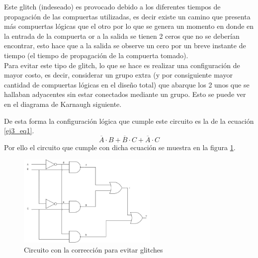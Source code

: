 %
\noindent
Este glitch (indeseado) es provocado debido a los diferentes tiempos de propagaci\'on de las compuertas utilizadas, es decir existe un camino que presenta m\'as compuertas l\'ogicas que el otro por lo que se genera un momento en donde en la entrada de la compuerta or a la salida se tienen 2 ceros que no se deber\'ian encontrar, esto hace que a la salida se observe un cero por un breve instante de tiempo (el tiempo de propagación de la compuerta tomado).\\
Para evitar este tipo de glitch, lo que se hace es realizar una configuración de mayor costo, es decir, considerar un grupo extra (y por consiguiente mayor cantidad de compuertas l\'ogicas en el diseño total) que abarque los 2 unos que se hallaban adyacentes sin estar conectados mediante un grupo. Esto se puede ver en el diagrama de Karnaugh siguiente.
%
\begin{center}
    \begin{Karnaughvuit}
    \end{Karnaughvuit}
\end{center}
%
\noindent
De esta forma la configuraci\'on l\'ogica que cumple este circuito es la de la ecuaci\'on \ref{ej3_eq1}.
%
\begin{equation}
    \overline{A} \cdot B+\overline{B} \cdot C+\overline{A} \cdot C
    \label{ej3_eq1}
\end{equation}
%
\noindent
Por ello el circuito que cumple con dicha ecuación se muestra en la figura \ref{ej3_circuito2}.
%
\begin{figure}[H]
    \centering
        \centering
        \includegraphics[width=0.6\textwidth]{figs/Ej3/circuito2.jpg} %
         \caption{Circuito con la corrección para evitar glitches}
         \label{ej3_circuito2}
\end{figure}
%
%
